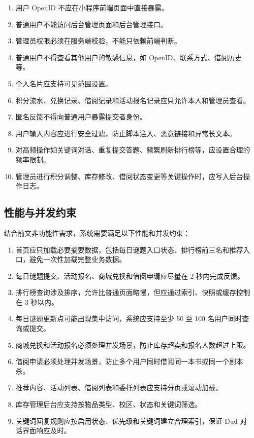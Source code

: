 \documentclass[a4paper,12pt]{article}
\begin{document}
\begin{enumerate}
    \item 用户 OpenID 不应在小程序前端页面中直接暴露。
    \item 普通用户不能访问后台管理页面和后台管理接口。
    \item 管理员权限必须在服务端校验，不能只依赖前端判断。
    \item 普通用户不得查看其他用户的敏感信息，如 OpenID、联系方式、借阅历史等。
    \item 个人名片应支持可见范围设置。
    \item 积分流水、兑换记录、借阅记录和活动报名记录应只允许本人和管理员查看。
    \item 匿名反馈不得向普通用户暴露提交者身份。
    \item 用户输入内容应进行安全过滤，防止脚本注入、恶意链接和异常长文本。
    \item 对高频操作如关键词对话、重复提交答题、频繁刷新排行榜等，应设置合理的频率限制。
    \item 管理员进行积分调整、库存修改、借阅状态变更等关键操作时，应写入后台操作日志。
\end{enumerate}

\subsection{性能与并发约束}

结合前文非功能性需求，系统需要满足以下性能和并发约束：

\begin{enumerate}
    \item 首页应只加载必要摘要数据，包括每日谜题入口状态、排行榜前三名和推荐入口，避免一次性加载完整业务数据。
    \item 每日谜题提交、活动报名、商城兑换和借阅申请应尽量在 2 秒内完成反馈。
    \item 排行榜查询涉及排序，允许比普通页面略慢，但应通过索引、快照或缓存控制在 3 秒以内。
    \item 每日谜题更新点可能出现集中访问，系统应支持至少 50 至 100 名用户同时查询或提交。
    \item 商城兑换和活动报名必须处理并发场景，防止库存超卖和报名人数超过上限。
    \item 借阅申请必须处理并发场景，防止多个用户同时借阅同一本书或同一个剧本杀。
    \item 推荐内容、活动列表、借阅列表和委托列表应支持分页或滚动加载。
    \item 库存管理后台应支持按物品类型、校区、状态和关键词筛选。
    \item 关键词回复规则应按启用状态、优先级和关键词建立合理索引，保证 Dud 对话界面响应及时。
\end{enumerate}
\end{document}
